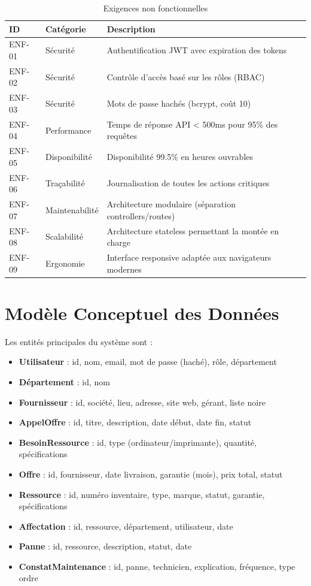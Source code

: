 \begin{table}[h!]
\centering
\begin{tabularx}{\textwidth}{|l|l|X|}
\hline
\textbf{ID} & \textbf{Catégorie} & \textbf{Description} \\
\hline
ENF-01 & Sécurité & Authentification JWT avec expiration des tokens \\
\hline
ENF-02 & Sécurité & Contrôle d'accès basé sur les rôles (RBAC) \\
\hline
ENF-03 & Sécurité & Mots de passe hachés (bcrypt, coût 10) \\
\hline
ENF-04 & Performance & Temps de réponse API < 500ms pour 95\% des requêtes \\
\hline
ENF-05 & Disponibilité & Disponibilité 99.5\% en heures ouvrables \\
\hline
ENF-06 & Traçabilité & Journalisation de toutes les actions critiques \\
\hline
ENF-07 & Maintenabilité & Architecture modulaire (séparation controllers/routes) \\
\hline
ENF-08 & Scalabilité & Architecture stateless permettant la montée en charge \\
\hline
ENF-09 & Ergonomie & Interface responsive adaptée aux navigateurs modernes \\
\hline
\end{tabularx}
\caption{Exigences non fonctionnelles}
\end{table}

\section{Modèle Conceptuel des Données}

Les entités principales du système sont :

\begin{itemize}
    \item \textbf{Utilisateur} : id, nom, email, mot de passe (haché), rôle, département
    \item \textbf{Département} : id, nom
    \item \textbf{Fournisseur} : id, société, lieu, adresse, site web, gérant, liste noire
    \item \textbf{AppelOffre} : id, titre, description, date début, date fin, statut
    \item \textbf{BesoinRessource} : id, type (ordinateur/imprimante), quantité, spécifications
    \item \textbf{Offre} : id, fournisseur, date livraison, garantie (mois), prix total, statut
    \item \textbf{Ressource} : id, numéro inventaire, type, marque, statut, garantie, spécifications
    \item \textbf{Affectation} : id, ressource, département, utilisateur, date
    \item \textbf{Panne} : id, ressource, description, statut, date
    \item \textbf{ConstatMaintenance} : id, panne, technicien, explication, fréquence, type ordre
\end{itemize}
